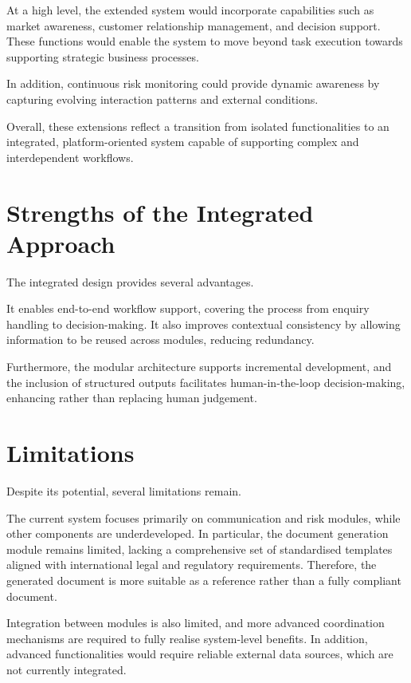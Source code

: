 \documentclass[12pt,a4paper]{report}
\begin{document}
At a high level, the extended system would incorporate capabilities such as market awareness, customer relationship management, and decision support. These functions would enable the system to move beyond task execution towards supporting strategic business processes.

In addition, continuous risk monitoring could provide dynamic awareness by capturing evolving interaction patterns and external conditions.

Overall, these extensions reflect a transition from isolated functionalities to an integrated, platform-oriented system capable of supporting complex and interdependent workflows.

\section{Strengths of the Integrated Approach}

The integrated design provides several advantages.

It enables end-to-end workflow support, covering the process from enquiry handling to decision-making. It also improves contextual consistency by allowing information to be reused across modules, reducing redundancy.

Furthermore, the modular architecture supports incremental development, and the inclusion of structured outputs facilitates human-in-the-loop decision-making, enhancing rather than replacing human judgement.

\section{Limitations}

Despite its potential, several limitations remain.

The current system focuses primarily on communication and risk modules, while other components are underdeveloped. In particular, the document generation module remains limited, lacking a comprehensive set of standardised templates aligned with international legal and regulatory requirements. Therefore, the generated document is more suitable as a reference rather than a fully compliant document.

Integration between modules is also limited, and more advanced coordination mechanisms are required to fully realise system-level benefits. In addition, advanced functionalities would require reliable external data sources, which are not currently integrated.
\end{document}
